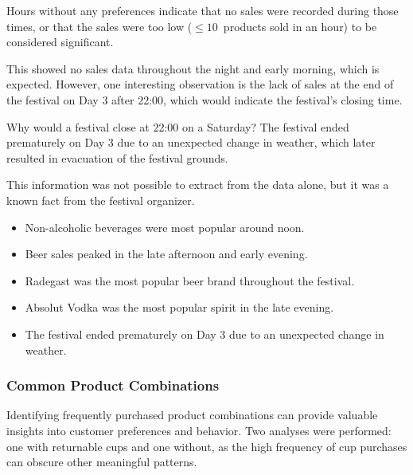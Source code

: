 Hours without any preferences indicate that no sales were recorded during those times, or that the sales were too low (\(\leq 10\)~products sold in an hour) to be considered significant.

This showed no sales data throughout the night and early morning, which is expected.
However, one interesting observation is the lack of sales at the end of the festival on Day 3 after 22:00, which would indicate the festival's closing time.

\begin{infobox}{Why would a festival close at 22:00 on a Saturday?}
	The festival ended prematurely on Day 3 due to an unexpected change in weather, which later resulted in evacuation of the festival grounds.
\end{infobox}

This information was not possible to extract from the data alone, but it was a known fact from the festival organizer.

\begin{keytakeaways}
	\begin{itemize}
		\item Non-alcoholic beverages were most popular around noon.
		\item Beer sales peaked in the late afternoon and early evening.
		\item Radegast was the most popular beer brand throughout the festival.
		\item Absolut Vodka was the most popular spirit in the late evening.
		\item The festival ended prematurely on Day 3 due to an unexpected change in weather.
	\end{itemize}
\end{keytakeaways}


\subsubsection{Common Product Combinations}
\label{subsubsec:analysis-common-combinations}


Identifying frequently purchased product combinations can provide valuable insights into customer preferences and behavior.
Two analyses were performed: one with returnable cups and one without, as the high frequency of cup purchases can obscure other meaningful patterns.

